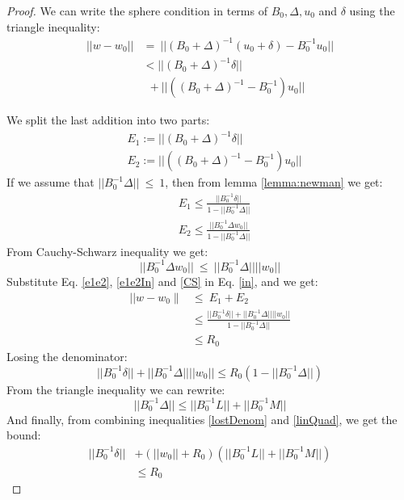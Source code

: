 \documentclass[11pt,twocolumn,varwidth=true,a4paper,fleqn]{article}
\begin{document}
\begin{proof}
We can write the sphere condition in terms of $B_0, \Delta, u_0$ and $\delta$ using the triangle
inequality:
\begin{equation} \label{in}
\begin{split}
||w-w_0|| & = \ ||(B_0+\Delta)^{-1}(u_0+\delta) - B_0^{-1}u_0|| \\
& < ||(B_0+\Delta)^{-1}\delta|| \\
& \ \ + ||((B_0+\Delta)^{-1} - B_0^{-1})u_0||
\end{split}
\end{equation}

We split the last addition into two parts:
\begin{equation}  \label{e1e2}
\begin{split}
& E_1:= ||(B_0+\Delta)^{-1}\delta|| \\
& E_2:= ||((B_0+\Delta)^{-1} - B_0^{-1})u_0||
\end{split}
\end{equation}
If we assume that $||B_0^{-1}\Delta||\ \leq \ 1$, 
then from lemma \ref{lemma:newman} we get:
\begin{equation} \label{e1e2In}
\begin{split}
& E_1 \leq \frac{||B_0^{-1}\delta||}{1-||B_0^{-1}\Delta||} \\
& E_2 \leq  \frac{|| B_0^{-1}\Delta w_0||}{1-||B_0^{-1}\Delta||}
\end{split}
\end{equation}
From Cauchy-Schwarz inequality we get:
\begin{equation} \label{CS}
||B_0^{-1}\Delta w_0|| \ \leq \ ||B_0^{-1}\Delta||||w_0||
\end{equation}
Substitute Eq. \ref{e1e2}, \ref{e1e2In} and \ref{CS} in Eq. \ref{in}, and we
get:
\begin{equation}
\begin{split}
|| w-w_0 \parallel & \leq \ E_1+E_2 \\
& \leq \frac{||B_0^{-1}\delta|| + ||B_0^{-1}\Delta||||w_0||}{1 -||B_0^{-1}\Delta||} \\
& \leq R_0
\end{split}
\end{equation}
Losing the denominator:
\begin{equation} \label{lostDenom}
||B_0^{-1}\delta|| + ||B_0^{-1}\Delta||||w_0||
\leq R_0(1 -||B_0^{-1}\Delta||)
\end{equation}
From the triangle inequality we can rewrite:
\begin{equation} \label{linQuad}
||B_0^{-1}\Delta|| \leq ||B_0^{-1}L||+||B_0^{-1}M||
\end{equation}
And finally, from combining inequalities \ref{lostDenom} and \ref{linQuad},
we get the bound:
\begin{equation} \label{convexBound}
\begin{split}
||B_0^{-1}\delta|| &+ (||w_0||+R_0)(||B_0^{-1}L||+||B_0^{-1}M||) \\ & \leq  R_0
\end{split}
\end{equation}
\end{proof}
\end{document}
